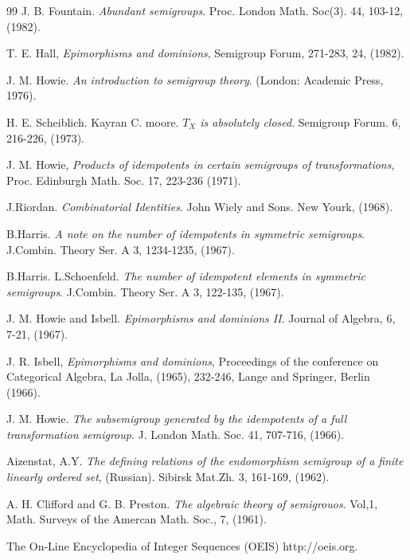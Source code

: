 \documentclass[10pt]{extarticle}
\numberwithin{equation}{section}
\numberwithin{bbb}{section}
\numberwithin{equation}{section}
\begin{document}
\begin{thebibliography}{99}
 J. B. Fountain.  \textit{Abundant semigroups}. Proc. London Math. Soc(3). 44, 103-12, (1982).

 T. E. Hall, \textit{Epimorphisms and dominions}, Semigroup Forum, 271-283, 24, (1982).

 J. M. Howie. \textit{An introduction to semigroup theory}. (London: Academic Press, 1976).

 H. E. Scheiblich. Kayran C. moore. \textit{$T_X$ is absolutely closed}. Semigroup Forum. 6, 216-226, (1973).

 J. M. Howie, \textit{Products of idempotents in certain semigroups of transformations}, Proc. Edinburgh Math. Soc. 17, 223-236 (1971).

  J.Riordan. \textit{Combinatorial Identities}. John Wiely and Sons. New Yourk, (1968).

  B.Harris. \textit{A note on the number of idempotents in symmetric semigroups}. J.Combin. Theory Ser. A 3, 1234-1235, (1967).

  B.Harris. L.Schoenfeld. \textit{The number of idempotent elements in symmetric semigroups}. J.Combin. Theory Ser. A 3, 122-135, (1967).

   J. M. Howie and Isbell. \textit{Epimorphisms and dominions II}. Journal of Algebra, 6, 7-21, (1967).

   J. R. Isbell, \textit{Epimorphisms and dominions}, Proceedings of the conference on Categorical Algebra, La Jolla, (1965), 232-246, Lange and Springer, Berlin (1966).

  J. M. Howie. \textit{The subsemigroup generated by the idempotents of a full transformation semigroup}. J. London Math. Soc. 41, 707-716, (1966).

 Aizenstat, A.Y. \textit{The defining relations of the endomorphism semigroup of a finite linearly ordered set}, (Russian). Sibirsk Mat.Zh. 3, 161-169, (1962).

 A. H. Clifford and G. B. Preston. \textit{The algebraic theory of semigrouos}. Vol,1, Math. Surveys of the Amercan Math. Soc., 7, (1961).   

  The On-Line Encyclopedia of Integer Sequences (OEIS) http://oeis.org.     

\end{thebibliography}
\end{document}
